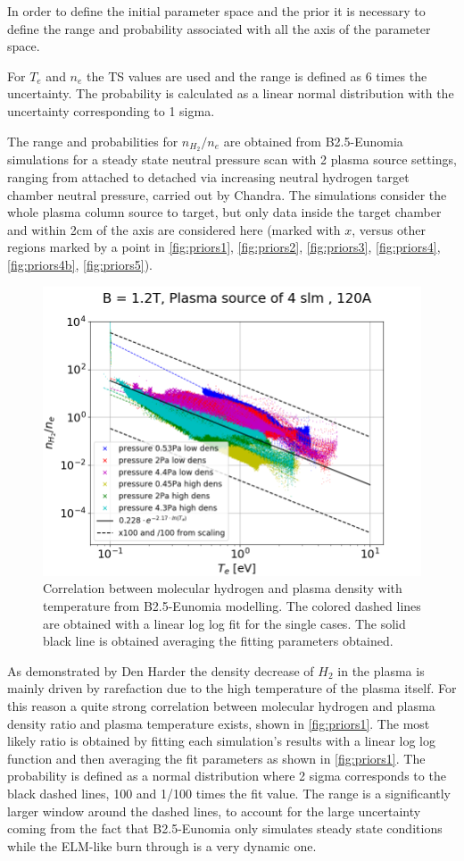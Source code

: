 In order to define the initial parameter space and the prior it is necessary to define the range and probability associated with all the axis of the parameter space.

For $T_e$ and $n_e$ the TS values are used and the range is defined as 6 times the uncertainty. The probability is calculated as a linear normal distribution with the uncertainty corresponding to 1 sigma.

The range and probabilities for $n_{H_2}/n_e$ are obtained from B2.5-Eunomia simulations for a steady state neutral pressure scan with 2 plasma source settings, ranging from attached to detached via increasing neutral hydrogen target chamber neutral pressure, carried out by Chandra.\cite{Chandra2021,Chandra2022} The simulations consider the whole plasma column source to target, but only data inside the target chamber and within 2cm of the axis are considered here (marked with $x$, versus other regions marked by a point in \autoref{fig:priors1}, \ref{fig:priors2}, \ref{fig:priors3}, \ref{fig:priors4}, \ref{fig:priors4b}, \ref{fig:priors5}).

\begin{figure}[!ht]
	\centering
	\includegraphics[width=0.7\linewidth,trim={0 0 30 45},clip]{Chapters/chapter3/figs/nH2_ne3.png}
	\caption{Correlation between molecular hydrogen and plasma density with temperature from B2.5-Eunomia modelling. The colored dashed lines are obtained with a linear log log fit for the single cases. The solid black line is obtained averaging the fitting parameters obtained.}
	\label{fig:priors1}
\end{figure}


As demonstrated by Den Harder\cite{DenHarder2015} the density decrease of $H_2$ in the plasma is mainly driven by rarefaction due to the high temperature of the plasma itself. For this reason a quite strong correlation between molecular hydrogen and plasma density ratio  and plasma temperature exists, shown in \autoref{fig:priors1}. The most likely ratio is obtained by fitting each simulation's results with a linear log log function and then averaging the fit parameters as shown in \autoref{fig:priors1}. The probability is defined as a normal distribution where 2 sigma corresponds to the black dashed lines, 100 and 1/100 times the fit value. The range is a significantly larger window around the dashed lines, to account for the large uncertainty coming from the fact that B2.5-Eunomia only simulates steady state conditions while the ELM-like burn through is a very dynamic one.

